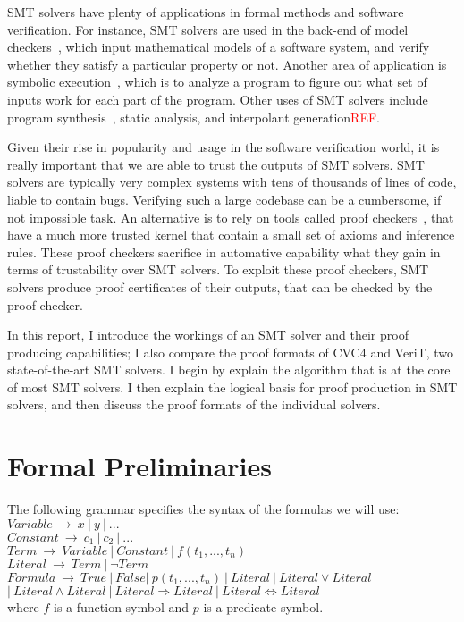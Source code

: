 \documentclass{article}
\begin{document}
SMT solvers have plenty of applications in formal methods 
and software verification. For instance, SMT solvers are used 
in the back-end of model checkers~\cite{DBLP:books/daglib/0020348}, which input mathematical 
models of a software system, and verify whether they 
satisfy a particular property or not. Another area of 
application is symbolic
execution~\cite{DBLP:journals/csur/BaldoniCDDF18}, 
which is to analyze a 
program to figure out what set of inputs work for each 
part of the program. Other uses of SMT solvers include 
program synthesis~\cite{synth}, static analysis, 
and interpolant generation\textcolor{red}{REF}.

Given their rise in popularity and usage in the software 
verification world, it is really important that we are able 
to trust the outputs of SMT solvers. SMT solvers are typically 
very complex systems with tens of thousands of lines of code, 
liable to contain bugs. Verifying such a large codebase can 
be a cumbersome, if not impossible task. An alternative is 
to rely on tools called proof checkers~\cite{proofasst}, 
that have a much more trusted kernel that contain a small 
set of axioms and inference rules. These proof checkers 
sacrifice in automative capability what they gain in terms 
of trustability over SMT solvers. To exploit these proof 
checkers, SMT solvers produce proof certificates of their 
outputs, that can be checked by the proof checker.

In this report, I introduce the workings of an SMT solver 
and their proof producing capabilities; I also compare the 
proof formats of CVC4 and VeriT, two state-of-the-art SMT solvers. I begin by explain the algorithm that is at the core 
of most SMT solvers. I then explain the logical basis for 
proof production in SMT solvers, and then discuss the proof 
formats of the individual solvers.


\section{Formal Preliminaries}
\label{sec:prelim}
The following grammar specifies the syntax of the formulas we
will use: \\ 
$Variable\ \rightarrow\ x\ |\ y\ |\ ... $ \\
$Constant\ \rightarrow\ c_1\ |\ c_2\ |\ ... $ \\
$Term\ \rightarrow\ Variable\ |\ Constant\ |\ f(t_1, ..., t_n)$ \\
$Literal\ \rightarrow\ Term\ |\ \neg Term$ \\
$Formula\ \rightarrow\ True\ |\ False |\ p(t_1, ..., t_n)\ 
|\ Literal\ |\ Literal \lor Literal$ \\ 
$|\ Literal \land Literal\ |\ Literal \Rightarrow Literal\ |\ Literal \iff Literal$ \\
where $f$ is a function symbol and $p$ is a predicate symbol.
\end{document}
